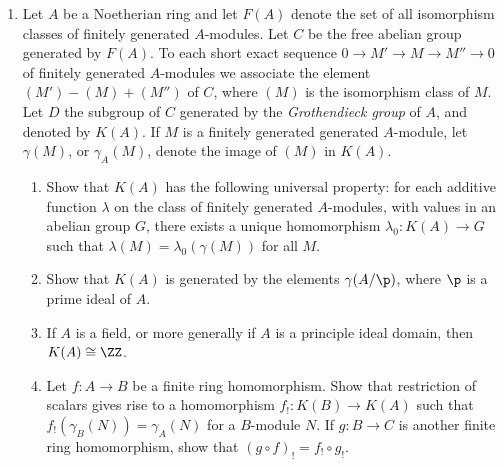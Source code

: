 \documentclass[12pt]{amsart}
\begin{document}
\begin{enumerate}
  \item[7.26] {
      Let $A$ be a Noetherian ring and let $F(A)$ denote the set of all isomorphism classes of finitely generated $A$-modules.
      Let $C$ be the free abelian group generated by $F(A)$.
      To each short exact sequence $0\to M'\to M\to M''\to 0$ of finitely generated $A$-modules we associate the element $(M')-(M)+(M'')$ of $C$, where $(M)$ is the isomorphism class of $M$.
      Let $D$ the subgroup of $C$ generated by the \emph{Grothendieck group} of $A$, and denoted by $K(A)$.
      If $M$ is a finitely generated generated $A$-module, let $\gamma(M)$, or $\gamma_A(M)$, denote the image of $(M)$ in $K(A)$.
      \begin{enumerate}
        \item Show that $K(A)$ has the following universal property: for each additive function $\lambda$ on the class of finitely generated $A$-modules, with values in an abelian group $G$, there exists a unique homomorphism $\lambda_0:K(A)\to G$ such that $\lambda(M)=\lambda_0(\gamma(M))$ for all $M$.
        \item Show that $K(A)$ is generated by the elements $\gamma(A/\p)$, where $\p$ is a prime ideal of $A$.
        \item If $A$ is a field, or more generally if $A$ is a principle ideal domain, then $K(A)\cong \ZZ$.
        \item Let $f:A\to B$ be a finite ring homomorphism.
          Show that restriction of scalars gives rise to a homomorphism $f_!:K(B)\to K(A)$ such that $f_!(\gamma_B(N))=\gamma_A(N)$ for a $B$-module $N$.
          If $g:B\to C$ is another finite ring homomorphism, show that $(g\circ f)_!=f_!\circ g_!$.
      \end{enumerate}
    }
\end{enumerate}
\end{document}
